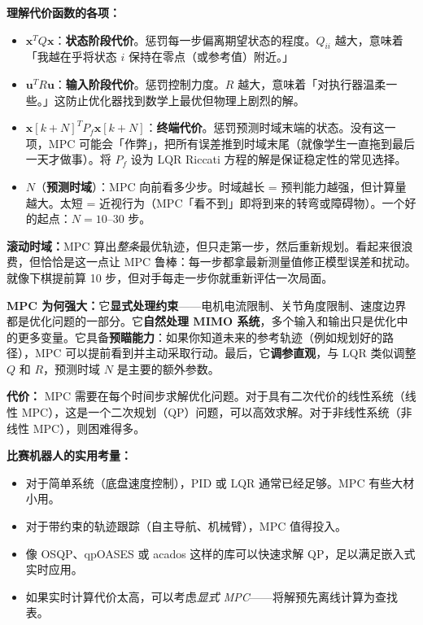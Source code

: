 \textbf{理解代价函数的各项：}
\begin{itemize}
    \item $\mathbf{x}^T Q \mathbf{x}$：\textbf{状态阶段代价}。惩罚每一步偏离期望状态的程度。$Q_{ii}$ 越大，意味着「我越在乎将状态 $i$ 保持在零点（或参考值）附近。」
    \item $\mathbf{u}^T R \mathbf{u}$：\textbf{输入阶段代价}。惩罚控制力度。$R$ 越大，意味着「对执行器温柔一些。」这防止优化器找到数学上最优但物理上剧烈的解。
    \item $\mathbf{x}[k+N]^T P_f \mathbf{x}[k+N]$：\textbf{终端代价}。惩罚预测时域末端的状态。没有这一项，MPC 可能会「作弊」，把所有误差推到时域末尾（就像学生一直拖到最后一天才做事）。将 $P_f$ 设为 LQR Riccati 方程的解是保证稳定性的常见选择。
    \item $N$（\textbf{预测时域}）：MPC 向前看多少步。时域越长 = 预判能力越强，但计算量越大。太短 = 近视行为（MPC「看不到」即将到来的转弯或障碍物）。一个好的起点：$N = 10$--$30$ 步。
\end{itemize}

\textbf{滚动时域：}MPC 算出\textit{整条}最优轨迹，但只走第一步，然后重新规划。看起来很浪费，但恰恰是这一点让 MPC 鲁棒：每一步都拿最新测量值修正模型误差和扰动。就像下棋提前算 10 步，但对手每走一步你就重新评估一次局面。

\textbf{MPC 为何强大：}它\textbf{显式处理约束}——电机电流限制、关节角度限制、速度边界都是优化问题的一部分。它\textbf{自然处理 MIMO 系统}，多个输入和输出只是优化中的更多变量。它具备\textbf{预瞄能力}：如果你知道未来的参考轨迹（例如规划好的路径），MPC 可以提前看到并主动采取行动。最后，它\textbf{调参直观}，与 LQR 类似调整 $Q$ 和 $R$，预测时域 $N$ 是主要的额外参数。

\textbf{代价：} MPC 需要在每个时间步求解优化问题。对于具有二次代价的线性系统（线性 MPC），这是一个二次规划（QP）问题，可以高效求解。对于非线性系统（非线性 MPC），则困难得多。

\textbf{比赛机器人的实用考量：}
\begin{itemize}
    \item 对于简单系统（底盘速度控制），PID 或 LQR 通常已经足够。MPC 有些大材小用。
    \item 对于带约束的轨迹跟踪（自主导航、机械臂），MPC 值得投入。
    \item 像 OSQP、qpOASES 或 acados 这样的库可以快速求解 QP，足以满足嵌入式实时应用。
    \item 如果实时计算代价太高，可以考虑\textit{显式 MPC}——将解预先离线计算为查找表。
\end{itemize}

